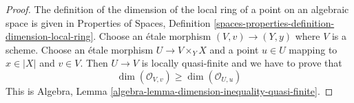 \documentclass{stacks-project}
\theoremstyle{plain}
\theoremstyle{definition}
\theoremstyle{remark}
\numberwithin{equation}{subsection}
\begin{document}
\begin{proof}
The definition of the dimension of the local ring of a point on an
algebraic space is given in Properties of Spaces, Definition
\ref{spaces-properties-definition-dimension-local-ring}.
Choose an \'etale morphism $(V, v) \to (Y, y)$ where $V$ is a scheme.
Choose an \'etale morphism $U \to V \times_Y X$ and a point $u \in U$
mapping to $x \in |X|$ and $v \in V$. Then $U \to V$ is locally
quasi-finite and we have to prove that
$$
\dim(\mathcal{O}_{V, v}) \geq \dim(\mathcal{O}_{U, u})
$$
This is Algebra, Lemma \ref{algebra-lemma-dimension-inequality-quasi-finite}.
\end{proof}
\end{document}
